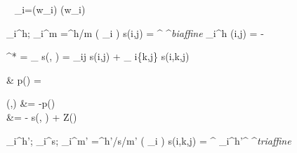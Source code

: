 \documentclass[11pt,a4paper]{article}
\begin{document}
\begin{figure}[tb]
\begin{center}
\begin{dependency}\begin{deptext}[column sep=.16cm] \
\label{equation:input}
_i=({w_i}) \oplus {}(w_i)

\label{mlp-arc}
_i^{h}; _i^{m} =^{h/m} \left( _i \right)
 \label{equation:biaffine}
s(i,j) =  ^
^\textit{biaffine}  _{i}^{h}
 \label{equation:biaffine-loss}
(i,j) = -

\label{equation:map-decoding}
{}^* = \arg\max_{} 
\label{eq:score-definition-2o}
s(, ) = \sum_{i\rightarrow j \in {}}s(i,j) + \sum_{
i\rightarrow \{k,j\} \in \boldsymbol{y} } s(i,k,j)
\label{equation:prob-labeled}
\begin{split}
& p(\mid{})  = 
\end{split}
\label{equation:training-loss-treecrf}
\begin{split}
(,) &= -\log p(\mid{})  \\
&= - s(\boldsymbol{x}, \boldsymbol{y}) + \log Z(\boldsymbol{x})
\end{split}

\label{mlp-sib}
_i^{h'}; _i^{s}; _i^{m'} =^{h'/s/m'} \left( _i \right)
 \label{equation:triaffine}
s(i,k,j) =
^
{_{i}^{h'}}^
^\textit{triaffine}


\end{deptext}
\end{dependency}
\end{center}
\end{figure}
\end{document}
